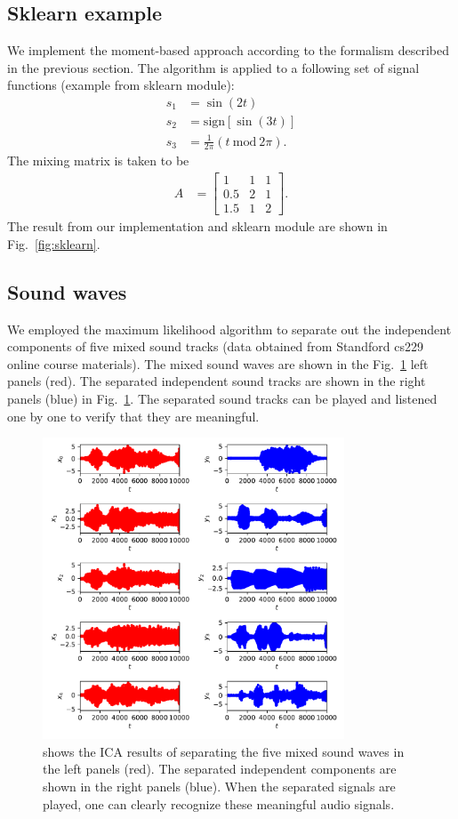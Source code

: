 \documentclass[aps,prl,preprint,superscriptaddress]{revtex4-2}
\begin{document}
\subsection{Sklearn example}
We implement the moment-based approach according to the formalism described in the previous section.
The algorithm is applied to a following set of signal functions (example from sklearn module):
\begin{align}
s_1 &= \sin(2 t) \\
s_2 &= \mathrm{sign} [\sin(3 t)] \\
s_3 &= \frac{1}{2\pi} (t~\mathrm{mod}~2\pi).
\end{align}
The mixing matrix is taken to be
\begin{align}
A &= \begin{bmatrix}
1 & 1 & 1 \\
0.5 & 2 & 1 \\
1.5 & 1 & 2
\end{bmatrix}.
\end{align}
The result from our implementation and sklearn module are shown in Fig.~\ref{fig:sklearn}.
\subsection{Sound waves}
We employed the maximum likelihood algorithm to separate out the independent components of five mixed sound tracks (data obtained from Standford cs229 online course materials). The mixed sound waves are shown in the  Fig.~\ref{fig:sound} left panels (red). The separated independent sound tracks are shown in the right panels (blue) in Fig.~\ref{fig:sound}. The separated sound tracks can be played and listened one by one to verify that they are meaningful. 
\begin{figure}[b]
\includegraphics[width=0.8\textwidth]{scripts/sound_example.pdf}
 \caption{\label{fig:sound} shows the ICA results of separating the five mixed sound waves in the left panels (red). The separated independent components are shown in the right panels (blue). When the separated signals are played, one can clearly recognize these meaningful audio signals.}
\end{figure}
\end{document}

